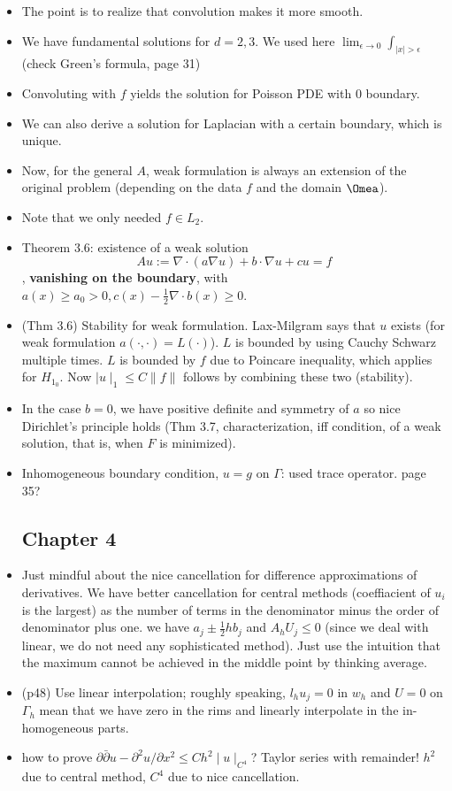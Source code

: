 \documentclass{article}
\theoremstyle{remark}
\begin{document}
\begin{itemize}
    \item The point is to realize that convolution makes it more smooth.
    \item We have fundamental solutions for $d=2,3$. We used here $\lim_{\epsilon\to 0}\int_{\mid x\mid>\epsilon}$ (check Green's formula, page 31)
    \item Convoluting with $f$ yields the solution for Poisson PDE with $0$ boundary.
    \item We can also derive a solution for Laplacian with a certain boundary, which is unique.
    \item Now, for the general $A$, weak formulation is always an extension of the original problem (depending on the data $f$ and the domain $\Omea$).
    \item Note that we only needed $f\in L_2$.
    \item Theorem 3.6: existence of a weak solution $$Au:=\nabla\cdot(a\nabla u)+b\cdot\nabla u+cu=f$$, \textbf{vanishing on the boundary}, with $a(x)\geq a_0>0, c(x)-\frac 12\nabla\cdot b(x)\geq 0$.
    \item (Thm 3.6) Stability for weak formulation. Lax-Milgram says that $u$ exists (for weak formulation $a(\cdot,\cdot)=L(\cdot)$). $L$ is bounded by using Cauchy Schwarz multiple times. $L$ is bounded by $f$ due to Poincare inequality, which applies for $H_1_0$. Now $\mid u\mid_1\leq C\lVert f\rVert$ follows by combining these two (stability).
    \item In the case $b=0$, we have positive definite and symmetry of $a$ so nice Dirichlet's principle holds (Thm 3.7, characterization, iff condition, of a weak solution, that is, when $F$ is minimized).
    \item Inhomogeneous boundary condition, $u=g$ on $\Gamma$: used trace operator. page 35?
    \subsection*{Chapter 4}
    \item Just mindful about the nice cancellation for difference approximations of derivatives. We have better cancellation for central methods (coeffiacient of $u_i$ is the largest) as the number of terms in the denominator minus the order of denominator plus one. we have $a_j\pm \frac 12 hb_j$ and $A_hU_j\leq 0$ (since we deal with linear, we do not need any sophisticated method). Just use the intuition that the maximum cannot be achieved in the middle point by thinking average.
    \item (p48) Use linear interpolation; roughly speaking, $l_h u_j=0$ in $w_h$ and $U=0$ on $\Gamma_h$ mean that we have zero in the rims and linearly interpolate in the in-homogeneous parts.
    \item how to prove $\partial\bar\partial u-\partial^2 u/\partial x^2\leq Ch^2\mid u\mid_{C^4}$? Taylor series with remainder! $h^2$ due to central method, $C^4$ due to nice cancellation.
    

\end{itemize}
\end{document}
